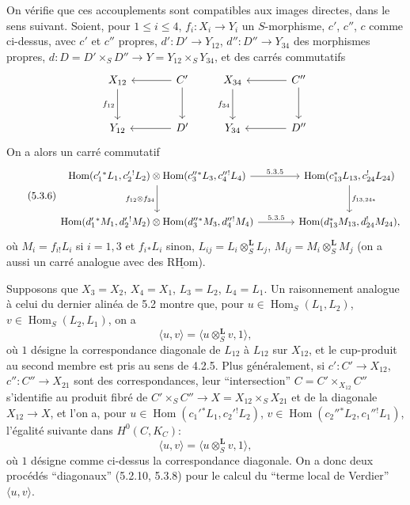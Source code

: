\documentclass[11pt]{article}
\DeclareMathOperator{\Hom}{Hom}
\newcommand{\R}{\mathrm{R}}\newcommand{\RHomCore}{\mathrm{RHom}}
\providecommand{\RHom}{\RHomCore}
\providecommand{\uRHom}{\underline{\RHom}}
\providecommand{\RHom}{\RHomCore}
\providecommand{\Hom}{\operatorname{Hom}}
\providecommand{\RHom}{\R\mathcal{H}om}
\providecommand{\R}{\mathrm R}
\providecommand{\RHom}{\RHomCore}
\providecommand{\Hom}{\operatorname{Hom}}
\begin{document}
On vérifie que ces accouplements sont compatibles aux images directes, dans le sens suivant. Soient, pour $1\leq i\leq4$, $f_i:X_i\to Y_i$ un $S$-morphisme, $c'$, $c''$, $c$ comme ci-dessus, avec $c'$ et $c''$ propres, $d':D'\to Y_{12}$, $d'':D''\to Y_{34}$ des morphismes propres, $d:D=D'\times_SD''\to Y=Y_{12}\times_SY_{34}$, et des carrés commutatifs
\[
\begin{tikzcd}[column sep=large,row sep=large]
X_{12} \arrow[d,"f_{12}"'] & C' \arrow[l] \arrow[d] \\
Y_{12} & D' \arrow[l]
\end{tikzcd}
\qquad
\begin{tikzcd}[column sep=large,row sep=large]
X_{34} \arrow[d,"f_{34}"'] & C'' \arrow[l] \arrow[d] \\
Y_{34} & D'' \arrow[l]
\end{tikzcd}
\]
On a alors un carré commutatif
\begin{equation}
\tag{5.3.6}
\begin{tikzcd}[column sep=large,row sep=large]
\Hom(c_1'{}^*L_1,c_2'{}^!L_2)\otimes\Hom(c_3''{}^*L_3,c_4''{}^!L_4) \arrow[r,"5.3.5"] \arrow[d,"f_{12}\otimes f_{34}"']
& \Hom(c_{13}^*L_{13},c_{24}^!L_{24}) \arrow[d,"f_{13,24*}"] \\
\Hom(d_1'{}^*M_1,d_2'{}^!M_2)\otimes\Hom(d_3''{}^*M_3,d_4''{}^!M_4) \arrow[r,"5.3.5"]
& \Hom(d_{13}^*M_{13},d_{24}^!M_{24}),
\end{tikzcd}
\end{equation}
où $M_i=f_{i!}L_i$ si $i=1,3$ et $f_i{}_*L_i$ sinon, $L_{ij}=L_i\otimes_S^{\mathbf L}L_j$, $M_{ij}=M_i\otimes_S^{\mathbf L}M_j$ (on a aussi un carré analogue avec des $\uRHom$).

Supposons que $X_3=X_2$, $X_4=X_1$, $L_3=L_2$, $L_4=L_1$. Un raisonnement analogue à celui du dernier alinéa de 5.2 montre que, pour $u\in\Hom_S(L_1,L_2)$, $v\in\Hom_S(L_2,L_1)$, on a
\begin{equation}
\tag{5.3.7}
\langle u,v\rangle=\langle u\otimes_S^{\mathbf L}v,1\rangle,
\end{equation}
où $1$ désigne la correspondance diagonale de $L_{12}$ à $L_{12}$ sur $X_{12}$, et le cup-produit au second membre est pris au sens de 4.2.5. Plus généralement, si $c':C'\to X_{12}$, $c'':C''\to X_{21}$ sont des correspondances, leur ``intersection'' $C=C'\times_{X_{12}}C''$ s'identifie au produit fibré de $C'\times_SC''\to X=X_{12}\times_SX_{21}$ et de la diagonale $X_{12}\to X$, et l'on a, pour $u\in\Hom(c_1'{}^*L_1,c_2'{}^!L_2)$, $v\in\Hom(c_2''{}^*L_2,c_1''{}^!L_1)$, l'égalité suivante dans $H^0(C,K_C)$:
\begin{equation}
\tag{5.3.8}
\langle u,v\rangle=\langle u\otimes_S^{\mathbf L}v,1\rangle,
\end{equation}
où $1$ désigne comme ci-dessus la correspondance diagonale. On a donc deux procédés ``diagonaux'' (5.2.10, 5.3.8) pour le calcul du ``terme local de Verdier'' $\langle u,v\rangle$.
\end{document}
